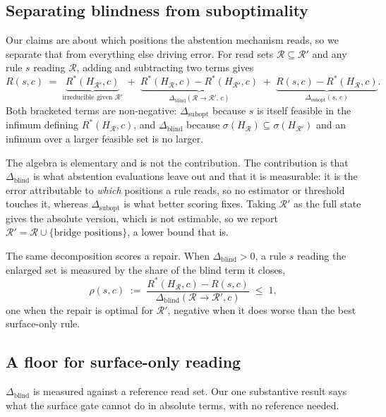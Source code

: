 \documentclass{article}
\begin{document}
\subsection{Separating blindness from suboptimality}

Our claims are about which positions the abstention mechanism reads, so we separate that from
everything else driving error. For read sets $\mathcal{R}\subseteq\mathcal{R}'$ and any rule $s$
reading $\mathcal{R}$, adding and subtracting two terms gives
\[
R(s,c)\;=\;\underbrace{R^\ast(H_{\mathcal{R}'},c)}_{\text{irreducible given }\mathcal{R}'}
\;+\;\underbrace{R^\ast(H_{\mathcal{R}},c)-R^\ast(H_{\mathcal{R}'},c)}_{\Delta_{\mathrm{blind}}(\mathcal{R}\to\mathcal{R}',\,c)}
\;+\;\underbrace{R(s,c)-R^\ast(H_{\mathcal{R}},c)}_{\Delta_{\mathrm{subopt}}(s,\,c)} .
\]
Both bracketed terms are non-negative: $\Delta_{\mathrm{subopt}}$ because $s$ is itself feasible in
the infimum defining $R^\ast(H_{\mathcal{R}},c)$, and $\Delta_{\mathrm{blind}}$ because
$\sigma(H_{\mathcal{R}})\subseteq\sigma(H_{\mathcal{R}'})$ and an infimum over a larger feasible set
is no larger.

The algebra is elementary and is not the contribution. The contribution is that
$\Delta_{\mathrm{blind}}$ is what abstention evaluations leave out and that it is measurable: it is
the error attributable to \emph{which} positions a rule reads, so no estimator or threshold touches
it, whereas $\Delta_{\mathrm{subopt}}$ is what better scoring fixes. Taking $\mathcal{R}'$ as the full
state gives the absolute version, which is not estimable, so we report
$\mathcal{R}'=\mathcal{R}\cup\{\text{bridge positions}\}$, a lower bound that is.

The same decomposition scores a repair. When $\Delta_{\mathrm{blind}}>0$, a rule $s$ reading the
enlarged set is measured by the share of the blind term it closes,
\[
\rho(s,c)\;:=\;\frac{R^\ast(H_{\mathcal{R}},c)-R(s,c)}{\Delta_{\mathrm{blind}}(\mathcal{R}\to\mathcal{R}',c)}\;\le\;1,
\]
one when the repair is optimal for $\mathcal{R}'$, negative when it does worse than the best
surface-only rule.

\subsection{A floor for surface-only reading}

$\Delta_{\mathrm{blind}}$ is measured against a reference read set. Our one substantive result says
what the surface gate cannot do in absolute terms, with no reference needed.
\end{document}
